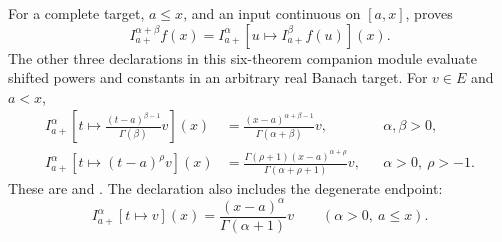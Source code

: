\documentclass[11pt,oneside]{article}
\theoremstyle{definition}
\theoremstyle{remark}
\newcommand{\1}{\mathbf 1}
\begin{document}
\begin{statusbox}
For a complete target, \(a\le x\), and an input continuous on \([a,x]\),
 proves
\begin{equation}
 I_{a+}^{\alpha+\beta}f(x)
 =I_{a+}^{\alpha}\!\left[u\mapsto I_{a+}^{\beta}f(u)\right](x).
 \label{p0:eq:fractional-volterra-semigroup}
\end{equation}
The other three declarations in this six-theorem companion module evaluate shifted powers
and constants in an arbitrary real Banach target.  For \(v\in E\) and \(a<x\),
\begin{align}
 I_{a+}^{\alpha}\!\left[t\mapsto
   \frac{(t-a)^{\beta-1}}{\Gamma(\beta)}v\right](x)
 &=\frac{(x-a)^{\alpha+\beta-1}}{\Gamma(\alpha+\beta)}v,
 &&\alpha,\beta>0,
 \label{p0:eq:fractional-volterra-normalized-rpow}\\
 I_{a+}^{\alpha}\!\left[t\mapsto(t-a)^\rho v\right](x)
 &=\frac{\Gamma(\rho+1)(x-a)^{\alpha+\rho}}
        {\Gamma(\alpha+\rho+1)}v,
 &&\alpha>0,\ \rho>-1.
 \label{p0:eq:fractional-volterra-rpow}
\end{align}
These are  and
.  The declaration
 also includes the degenerate endpoint:
\begin{equation}
 I_{a+}^{\alpha}[t\mapsto v](x)
 =\frac{(x-a)^\alpha}{\Gamma(\alpha+1)}v
 \qquad(\alpha>0,\ a\le x).
 \label{p0:eq:fractional-volterra-const}
\end{equation}


\end{statusbox}
\end{document}

